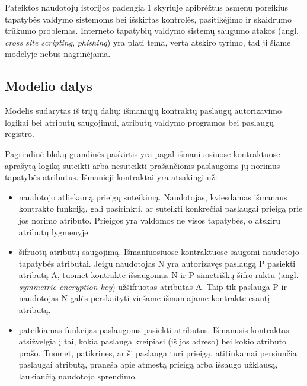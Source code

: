 Pateiktos naudotojų istorijos padengia 1 skyriuje apibrėžtus asmenų poreikius tapatybės valdymo
sistemoms bei išskirtas kontrolės, pasitikėjimo ir skaidrumo trūkumo problemas. Interneto tapatybių valdymo sistemų saugumo atakos (angl.
\textit{cross site scripting}, \textit{phishing}) yra plati tema, verta atskiro tyrimo, tad ji šiame modelyje nebus nagrinėjama.

\subsection{Modelio dalys}

Modelis sudarytas iš trijų dalių: išmaniųjų kontraktų paslaugų autorizavimo logikai bei atributų saugojimui,
atributų valdymo programos bei paslaugų registro.


Pagrindinė blokų grandinės paskirtis yra pagal išmaniuosiuose kontraktuose aprašytą logiką suteikti arba nesuteikti
prašančioms paslaugoms jų norimus tapatybės atributus. Išmanieji kontraktai yra atsakingi už:

\begin{itemize}
    \item naudotojo atliekamą prieigų suteikimą. Naudotojas, kviesdamas išmanaus kontrakto funkciją, gali pasirinkti,
    ar suteikti konkrečiai paslaugai prieigą prie jos norimo atributo. Prieigos yra valdomos ne visos tapatybės, o
    atskirų atributų lygmenyje.

    \item šifruotų atributų saugojimą. Išmaniuosiuose kontraktuose saugomi naudotojo tapatybės atributai. Jeigu naudotojas N
    yra autorizavęs paslaugą P pasiekti atributą A, tuomet kontrakte išsaugomas N ir P simetriškų šifro raktu (angl.
    \textit{symmetric encryption key}) užšifruotas atributas A. Taip tik paslauga P
    ir naudotojas N galės perskaityti viešame išmaniajame kontrakte esantį atributą.

    \item pateikiamas funkcijas paslaugoms pasiekti atributus. Išmanusis kontraktas atsižvelgia į tai, kokia paslauga kreipiasi (iš
    jos adreso) bei kokio atributo prašo. Tuomet, patikrinęs, ar ši paslauga turi prieigą, atitinkamai persiunčia
    paslaugai atributą, praneša apie atmestą prieigą arba išsaugo užklausą, laukiančią naudotojo sprendimo.
\end{itemize}

